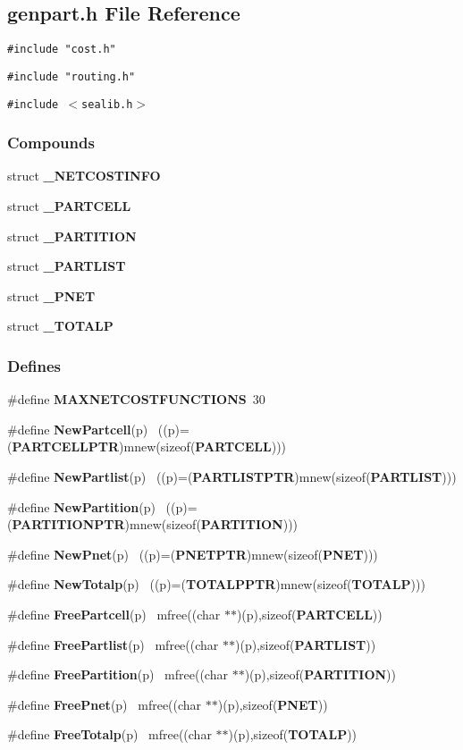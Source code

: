\subsection{genpart.h File Reference}
\label{genpart.h}
{\tt \#include "cost.h"}\par
{\tt \#include "routing.h"}\par
{\tt \#include $<$sealib.h$>$}\par
\subsubsection*{Compounds}
\begin{CompactItemize}
\item 
struct {\bf \_\-NETCOSTINFO}
\item 
struct {\bf \_\-PARTCELL}
\item 
struct {\bf \_\-PARTITION}
\item 
struct {\bf \_\-PARTLIST}
\item 
struct {\bf \_\-PNET}
\item 
struct {\bf \_\-TOTALP}
\end{CompactItemize}
\subsubsection*{Defines}
\begin{CompactItemize}
\item 
\#define {\bf MAXNETCOSTFUNCTIONS}\ 30
\item 
\#define {\bf New\-Partcell}(p) \ ((p)=({\bf PARTCELLPTR})mnew(sizeof({\bf PARTCELL})))
\item 
\#define {\bf New\-Partlist}(p) \ ((p)=({\bf PARTLISTPTR})mnew(sizeof({\bf PARTLIST})))
\item 
\#define {\bf New\-Partition}(p) \ ((p)=({\bf PARTITIONPTR})mnew(sizeof({\bf PARTITION})))
\item 
\#define {\bf New\-Pnet}(p) \ ((p)=({\bf PNETPTR})mnew(sizeof({\bf PNET})))
\item 
\#define {\bf New\-Totalp}(p) \ ((p)=({\bf TOTALPPTR})mnew(sizeof({\bf TOTALP})))
\item 
\#define {\bf Free\-Partcell}(p) \ mfree((char $\ast$$\ast$)(p),sizeof({\bf PARTCELL}))
\item 
\#define {\bf Free\-Partlist}(p) \ mfree((char $\ast$$\ast$)(p),sizeof({\bf PARTLIST}))
\item 
\#define {\bf Free\-Partition}(p) \ mfree((char $\ast$$\ast$)(p),sizeof({\bf PARTITION}))
\item 
\#define {\bf Free\-Pnet}(p) \ mfree((char $\ast$$\ast$)(p),sizeof({\bf PNET}))
\item 
\#define {\bf Free\-Totalp}(p) \ mfree((char $\ast$$\ast$)(p),sizeof({\bf TOTALP}))
\end{CompactItemize}
